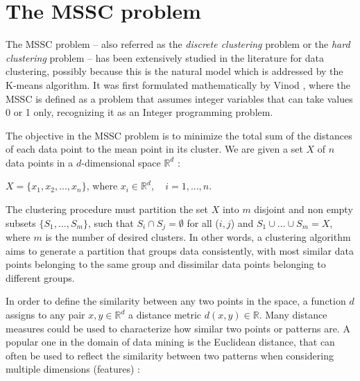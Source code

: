 \section{The MSSC problem}
The MSSC problem -- also referred as the \textit{discrete clustering} problem or the \textit{hard clustering} problem -- has been extensively studied in the literature for data clustering, possibly because this is the natural model which is addressed by the K-means algorithm. It was first formulated mathematically by Vinod \cite{Vinod1969}, where the MSSC is defined as a problem that assumes integer variables that can take values 0 or 1 only, recognizing it as an Integer programming problem.

The objective in the MSSC problem is to minimize the total sum of the distances of each data point to the mean point in its cluster. We are given a set $X$ of $n$ data points in a $d$-dimensional space $\mathbb{R}^d$ \cite{Bagirov2006}:

\begin{center}%
$X = \{x_1, x_2, ..., x_n\}$, where $x_i \in \mathbb{R}^d, \quad i = 1, ..., n.$
\end{center}


The clustering procedure must partition the set $X$ into $m$ disjoint and non empty subsets $\{S_1,\dots,S_m\}$, such that $S_i \cap S_j = \emptyset$ for all ($i,j$) and $S_1 \cup \dots \cup S_m = X$, where $m$ is the number of desired clusters. In other words, a clustering algorithm aims to generate a partition that groups data consistently, with most similar data points belonging to the same group and dissimilar data points belonging to different groups.

In order to define the similarity between any two points in the space, a function $d$ assigns to any pair $x, y \in \mathbb{R}^d$ a distance metric $d(x,y) \in \mathbb{R}$. Many distance measures could be used to characterize how similar two points or patterns are. A popular one in the domain of data mining is the Euclidean distance, that can often be used to reflect the similarity between two patterns when considering multiple dimensions (features) \cite{Jain1999}:

